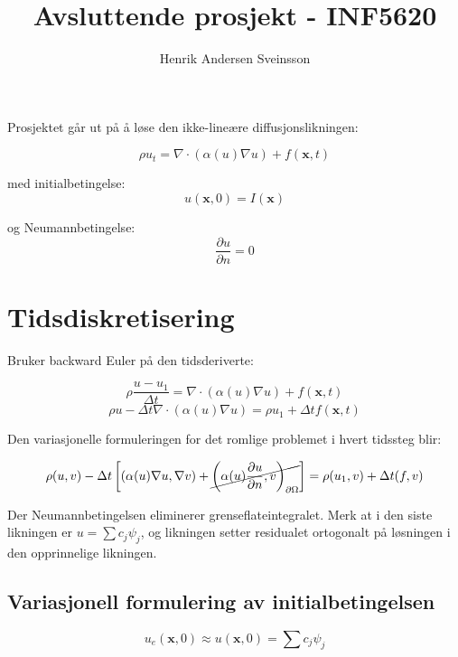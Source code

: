 \documentclass[a4paper, 10pt]{article}
\author{Henrik Andersen Sveinsson}
\title{Avsluttende prosjekt - INF5620}
\newcommand{\mb}{\mathbf}
\newcommand{\n}{\nabla}
\begin{document}
\maketitle

Prosjektet går ut på å løse den ikke-lineære diffusjonslikningen: 

\begin{equation}
	\rho u_t = \nabla \cdot (\alpha(u) \nabla u) + f(\mb{x}, t)
\end{equation}

med initialbetingelse:
\begin{equation}
	u(\mb{x}, 0) = I(\mb{x})
\end{equation}


og Neumannbetingelse:
\begin{equation}
	\frac{\partial u}{\partial n} = 0
\end{equation}

\section{Tidsdiskretisering}
Bruker backward Euler på den tidsderiverte:

\begin{equation}
	\rho \frac{u - u_1}{\Delta t} = \n \cdot (\alpha(u) \n u) + f(\mb{x}, t)
\end{equation}
\begin{equation}
	\rho u - \Delta t\n \cdot (\alpha(u) \n u) = \rho u_1 + \Delta t f(\mb{x}, t)
\end{equation}

Den variasjonelle formuleringen for det romlige problemet i hvert tidssteg blir:

\begin{equation}
	\rho (u, v) - \Delta t \left[ (\alpha(u) \nabla u, \nabla v) + \cancel{\left( \alpha(u) \frac{\partial u}{\partial n}, v\right)_{\partial \Omega}}\right] = \rho(u_1, v) + \Delta t (f, v)
\end{equation}

Der Neumannbetingelsen eliminerer grenseflateintegralet. 
Merk at i den siste likningen er $u = \sum c_j \psi_j$, og likningen setter residualet ortogonalt på løsningen i den opprinnelige likningen. 

\subsection{Variasjonell formulering av initialbetingelsen}
\begin{equation}
	u_e(\mb{x}, 0) \approx u(\mb{x}, 0) =  \sum c_j \psi_j
\end{equation}
\end{document}
